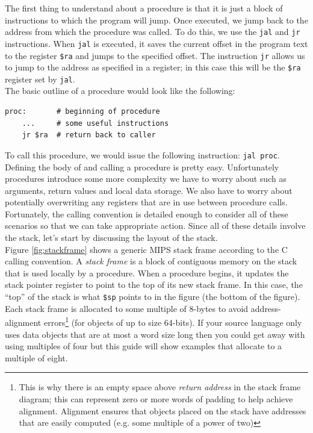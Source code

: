 \documentclass[12pt]{article}
\begin{document}
The first thing to understand about a procedure is that it is just a block of
     instructions to which the program will jump. Once executed, we jump back to
     the address from which the procedure was called. To do this, we use the
     \texttt{jal} and \texttt{jr} instructions. When \texttt{jal} is executed,
     it saves the current offset in the program text to the register
     \texttt{\$ra} and jumps to the specified offset. The instruction
     \texttt{jr} allows us to jump to the address as specified in a register; in
     this case this will be the \texttt{\$ra} register set by \texttt{jal}.\\

The basic outline of a procedure would look like the following:\\
\begin{lstlisting}
proc:       # beginning of procedure
    ...     # some useful instructions
    jr $ra  # return back to caller
\end{lstlisting}

To call this procedure, we would issue the following instruction: \texttt{jal
     proc}.\\

Defining the body of and calling a procedure is pretty easy. Unfortunately
     procedures introduce some more complexity we have to worry about such as
     arguments, return values and local data storage. We also have to worry
     about potentially overwriting any registers that are in use between
     procedure calls. Fortunately, the calling convention is detailed enough to
     consider all of these scenarios so that we can take appropriate
     action. Since all of these details involve the stack, let's start by
     discussing the layout of the stack.\\

Figure \ref{fig:stackframe} shows a generic MIPS stack frame according to the C
     calling convention. A \textit{stack frame} is a block of contiguous memory
     on the stack that is used locally by a procedure. When a procedure begins,
     it updates the stack pointer register to point to the top of its new stack
     frame. In this case, the ``top'' of the stack is what \texttt{\$sp} points
     to in the figure (the bottom of the figure). Each stack frame is allocated
     to some multiple of 8-bytes to avoid address-alignment errors\footnote{This
     is why there is an empty space above \textit{return address} in the stack
     frame diagram; this can represent zero or more words of padding to help
     achieve alignment. Alignment ensures that objects placed on the stack have
     addresses that are easily computed (e.g. some multiple of a power of two)}
     (for objects of up to size 64-bits). If your source language only uses data
     objects that are at most a word size long then you could get away with
     using multiples of four but this guide will show examples that allocate to
     a multiple of eight.\\
\end{document}
